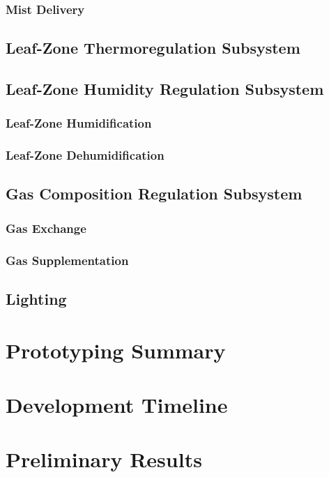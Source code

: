 \documentclass{report}
\begin{document}
\subsubsection{Mist Delivery}
\subsection{Leaf-Zone Thermoregulation Subsystem}
\subsection{Leaf-Zone Humidity Regulation Subsystem}
\subsubsection{Leaf-Zone Humidification}
\subsubsection{Leaf-Zone Dehumidification}
\subsection{Gas Composition Regulation Subsystem}
\subsubsection{Gas Exchange}
\subsubsection{Gas Supplementation}
\subsection{Lighting}

\section{Prototyping Summary}

\section{Development Timeline}

\section{Preliminary Results}

\newpage



\end{document}
